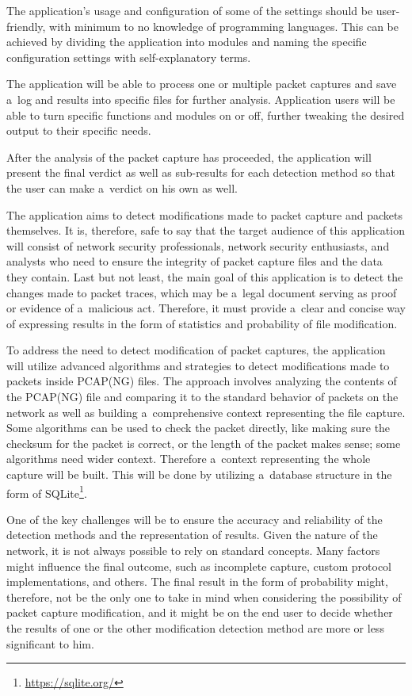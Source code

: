 \documentclass[
  printed,     %
  color,       %
  oneside,     %
  nosansbold,  %
  nocolorbold, %
  nolof,         %
  nolot,         %
]{fithesis4}
\begin{document}
The application's usage and configuration of some of the settings should be user-friendly, with minimum to no knowledge of programming languages. This can be achieved by dividing the application into modules and naming the specific configuration settings with self-explanatory terms.

The application will be able to process one or multiple packet captures and save a~log and results into specific files for further analysis. Application users will be able to turn specific functions and modules on or off, further tweaking the desired output to their specific needs.

After the analysis of the packet capture has proceeded, the application will present the final verdict as well as sub-results for each detection method so that the user can make a~verdict on his own as well.

The application aims to detect modifications made to packet capture and packets themselves. It is, therefore, safe to say that the target audience of this application will consist of network security professionals, network security enthusiasts, and analysts who need to ensure the integrity of packet capture files and the data they contain. Last but not least, the main goal of this application is to detect the changes made to packet traces, which may be a~legal document serving as proof or evidence of a~malicious act. Therefore, it must provide a~clear and concise way of expressing results in the form of statistics and probability of file modification.

To address the need to detect modification of packet captures, the application will utilize advanced algorithms and strategies to detect modifications made to packets inside PCAP(NG) files. The approach involves analyzing the contents of the PCAP(NG) file and comparing it to the standard behavior of packets on the network as well as building a~comprehensive context representing the file capture. Some algorithms can be used to check the packet directly, like making sure the checksum for the packet is correct, or the length of the packet makes sense; some algorithms need wider context. Therefore a~context representing the whole capture will be built. This will be done by utilizing a~database structure in the form of SQLite\footnote{\url{https://sqlite.org/}}.

One of the key challenges will be to ensure the accuracy and reliability of the detection methods and the representation of results. Given the nature of the network, it is not always possible to rely on standard concepts. Many factors might influence the final outcome, such as incomplete capture, custom protocol implementations, and others. The final result in the form of probability might, therefore, not be the only one to take in mind when considering the possibility of packet capture modification, and it might be on the end user to decide whether the results of one or the other modification detection method are more or less significant to him.
\end{document}
